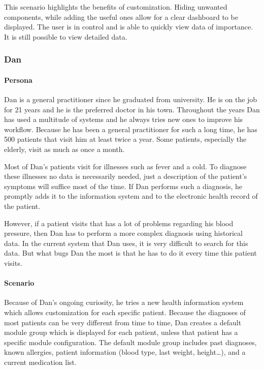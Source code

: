         \noindent This scenario highlights the benefits of customization. Hiding unwanted components, while adding the useful ones allow for a clear dashboard to be displayed. The user is in control and is able to quickly view data of importance. It is still possible to view detailed data.
        
        \subsubsection{Dan}

        \paragraph{Persona} Dan is a general practitioner since he graduated from university. He is on the job for 21 years and he is the preferred doctor in his town. Throughout the years Dan has used a multitude of systems and he always tries new ones to improve his workflow. Because he has been a general practitioner for such a long time, he has 500 patients that visit him at least twice a year. Some patients, especially the elderly, visit as much as once a month.

        Most of Dan's patients visit for illnesses such as fever and a cold. To diagnose these illnesses no data is necessarily needed, just a description of the patient's symptoms will suffice most of the time. If Dan performs such a diagnosis, he promptly adds it to the information system and to the electronic health record of the patient.

        However, if a patient visits that has a lot of problems regarding his blood pressure, then Dan has to perform a more complex diagnosis using historical data. In the current system that Dan uses, it is very difficult to search for this data. But what bugs Dan the most is that he has to do it every time this patient visits.

        \paragraph{Scenario} Because of Dan's ongoing curiosity, he tries a new health information system which allows customization for each specific patient. Because the diagnoses of most patients can be very different from time to time, Dan creates a default module group which is displayed for each patient, unless that patient has a specific module configuration. The default module group includes past diagnoses, known allergies, patient information (blood type, last weight, height\ldots), and a current medication list.

